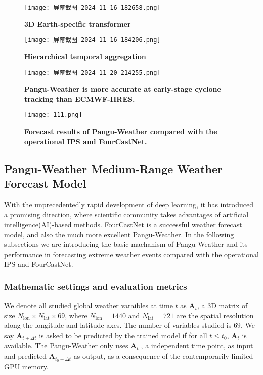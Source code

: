 \documentclass[conference]{IEEEtran}
\begin{document}
\begin{figure*}[h]
    \centering
    \texttt{[image: 屏幕截图 2024-11-16 182658.png]}
    \caption{\textbf{3D Earth-specific transformer\textsuperscript{\cite{b15}}}}
    \label{fig:enter-label}
\end{figure*}

\begin{figure}[h]
    \centering
    \texttt{[image: 屏幕截图 2024-11-16 184206.png]}
    \caption{\textbf{Hierarchical temporal aggregation}}
    \label{fig:enter-label}
\end{figure}

\begin{figure*}[h]
    \centering
    \texttt{[image: 屏幕截图 2024-11-20 214255.png]}
    \caption{\textbf{Pangu-Weather is more accurate at early-stage cyclone tracking than ECMWF-HRES.}}
    \texttt{[image: 111.png]}
    \caption{\textbf{Forecast results of Pangu-Weather compared with the operational IPS and FourCastNet.}}
    \label{fig:enter-label}
\end{figure*}

\subsection{Pangu-Weather Medium-Range Weather Forecast Model}
With the unprecedentedly rapid development of deep learning, it has introduced a promising direction, where scientific community takes advantages of artificial intelligence(AI)-based methods. FourCastNet is a successful weather forecast model, and also the much more excellent Pangu-Weather. In the following subsections we are introducing the basic machanism of Pangu-Weather and its performance in forecasting extreme weather events compared with the operational IPS and FourCastNet\cite{b18}.
\subsubsection{Mathematic settings and evaluation metrics}
We denote all studied global weather varaibles at time $t$ as $\mathbf{A}_t$, a 3D matrix of size $N_{\mathrm{lon}}\times N_{\mathrm{lat}} \times 69$, where $N_{\mathrm{lon}}=1440$ and $N_{\mathrm{lat}}=721$ are the spatial resolution along the longitude and latitude axes\cite{b15}. The number of variables studied is $69$\cite{b15}. We say $\mathbf{A}_{t+\Delta t}$ is asked to be predicted by the trained model if for all $t\leq t_0$, $\mathbf{A}_t$ is available. The Pangu-Weather only uses $\mathbf{A}_{t_0}$, a independent time point, as input and predicted $\mathbf{A}_{t_0+\Delta t}$ as output, as a consequence of the  contemporarily limited GPU memory.
\end{document}
